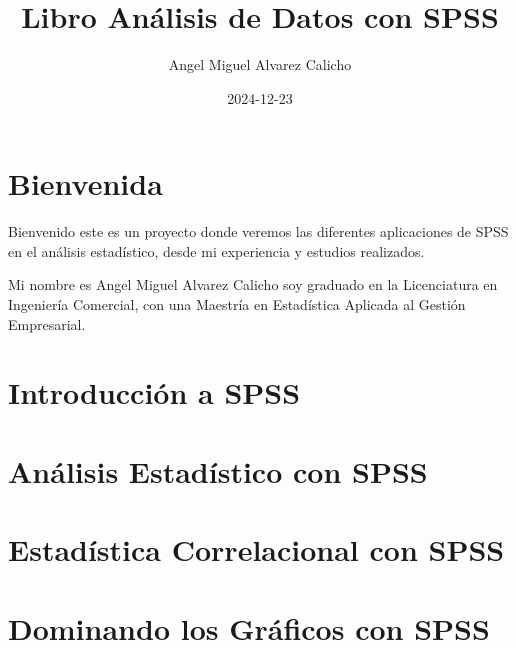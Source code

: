 \documentclass[
  letterpaper,
  DIV=11,
  numbers=noendperiod]{scrreprt}
\title{Libro Análisis de Datos con SPSS}
\author{Angel Miguel Alvarez Calicho}
\date{2024-12-23}
\renewcommand*\contentsname{Table of contents}
\newcommand\contentsname{Table of contents}
\begin{document}
\maketitle

\renewcommand*\contentsname{Table of contents}
{
\hypersetup{linkcolor=}
\setcounter{tocdepth}{2}
\tableofcontents
}


\chapter*{Bienvenida}\label{bienvenida}


Bienvenido este es un proyecto donde veremos las diferentes aplicaciones
de SPSS en el análisis estadístico, desde mi experiencia y estudios
realizados.

Mi nombre es Angel Miguel Alvarez Calicho soy graduado en la
Licenciatura en Ingeniería Comercial, con una Maestría en Estadística
Aplicada al Gestión Empresarial.


\chapter{Introducción a SPSS}\label{introducciuxf3n-a-spss}


\chapter{Análisis Estadístico con
SPSS}\label{anuxe1lisis-estaduxedstico-con-spss}


\chapter{Estadística Correlacional con
SPSS}\label{estaduxedstica-correlacional-con-spss}


\chapter{Dominando los Gráficos con
SPSS}\label{dominando-los-gruxe1ficos-con-spss}

\end{document}
